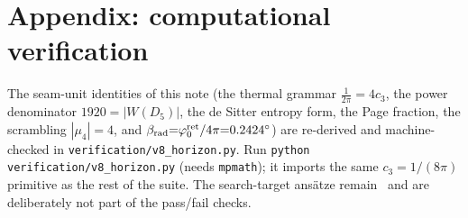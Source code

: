 \documentclass[11pt,a4paper]{article}
\newcommand{\cthree}{c_3}
\begin{document}
\section*{Appendix: computational verification}
The seam-unit identities of this note (the thermal grammar $\tfrac1{2\pi}{=}4\cthree$, the
power denominator $1920{=}|W(D_5)|$, the de Sitter entropy form, the Page fraction, the scrambling
$|\mu_4|{=}4$, and $\beta_{\rm rad}{=}\varphi_0^{\rm ret}/4\pi{=}0.2424^\circ$) are re-derived and machine-checked in
\texttt{verification/v8\_horizon.py}. Run \texttt{python verification/v8\_horizon.py} (needs
\texttt{mpmath}); it imports the same $\cthree{=}1/(8\pi)$ primitive as the rest of the suite. The
search-target ans\"atze remain \mO\ and are deliberately not part of the pass/fail checks.


\end{document}
